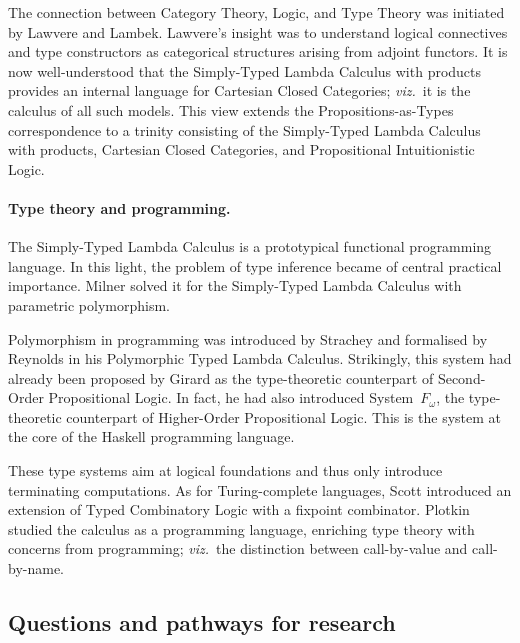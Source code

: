 \documentclass[11pt,twocolumn]{article}
\newcommand{\viz}{\emph{viz.}}
\newcommand{\lcalculus}{\mbox{$\lambda$-calculus}}
\newcommand{\SystemFomega}{\mbox{System~$F_\omega$}}
\begin{document}
The connection between Category Theory, Logic, and Type Theory was
initiated by Lawvere %
and Lambek. %
%
Lawvere's insight was to understand logical connectives and type constructors
as categorical structures arising from adjoint functors.  It is now
well-understood that the Simply-Typed Lambda Calculus with products provides
an internal language for Cartesian Closed Categories; \viz~it is the
calculus of all such models.  This view extends the Propositions-as-Types
correspondence to a trinity consisting of the Simply-Typed Lambda Calculus
with products, Cartesian Closed Categories, and Propositional
Intuitionistic Logic.

\paragraph*{Type theory and programming.}

The Simply-Typed Lambda Calculus is a prototypical functional programming
language.  In this light, the problem of type inference became of central
practical importance.  Milner %
solved it for the Simply-Typed Lambda Calculus with parametric polymorphism.  
 
Polymorphism in programming was introduced by Strachey %
and formalised by Reynolds %
in his Polymorphic Typed Lambda Calculus.
Strikingly, this system had already been proposed by
Girard %
as the type-theoretic counterpart of Second-Order Propositional Logic. 
In fact, he %
had also introduced {\SystemFomega}, the type-theoretic counterpart of
Higher-Order Propositional Logic.  
This is the system %
at the core of the Haskell programming language. 

These type systems aim at logical foundations and thus only introduce
terminating computations.  As for Turing-complete languages, 
Scott %
introduced an extension of Typed Combinatory Logic with a fixpoint combinator. 
Plotkin %
studied the calculus as a programming language, enriching type
theory with concerns from programming; \viz~the distinction between
call-by-value and call-by-name. %

\subsection{Questions and pathways for research}
\end{document}
